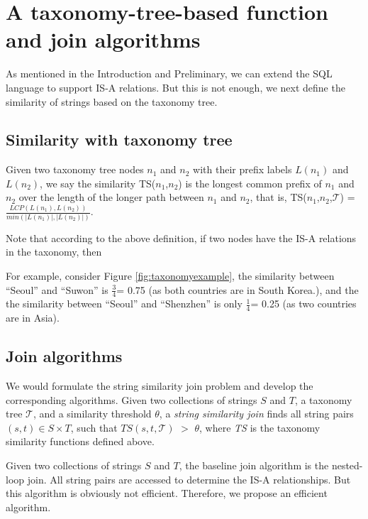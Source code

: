 \section{A taxonomy-tree-based function and join algorithms}

As mentioned in the Introduction and Preliminary, we can extend the SQL language to support IS-A relations. But this is not enough, we next define the similarity of strings based on the taxonomy tree.


\subsection{Similarity with taxonomy tree}


\begin{definition}
Given two taxonomy tree nodes $n_1$ and $n_2$ with their prefix labels $L(n_1)$ and $L(n_2)$, we say the similarity TS($n_1$,$n_2$) is the longest common prefix of  $n_1$ and $n_2$ over the length of the longer path between $n_1$ and $n_2$, that is,  TS($n_1$,$n_2$,$\mathcal{T}$) = $\frac{LCP(L(n_1),L(n_2))}{min(|L(n_1)|,|L(n_2)|)}$. \end{definition}

\smallskip

Note that according to the above definition, if two nodes have the IS-A relations in the taxonomy, then

For example, consider Figure \ref{fig:taxonomyexample}, the similarity between ``\textsf{Seoul}'' and ``\textsf{Suwon}'' is $\frac{3}{4}$= 0.75 (as both countries are in South Korea.), and the the similarity between ``\textsf{Seoul}'' and ``\textsf{Shenzhen}'' is only $\frac{1}{4}$= 0.25 (as two countries are in Asia).

\subsection{Join algorithms}


We would formulate the string similarity join problem and develop the corresponding algorithms. Given two collections of strings $S$ and $T$, a taxonomy tree
$\mathcal{T}$, and a similarity threshold $\theta$, a \textit{string
  similarity join} finds all string pairs $(s, t) \in S \times T$,
such that $TS(s,t,\mathcal{T})$ $>$ $\theta$, where \textit{TS} is
 the taxonomy similarity functions defined above.



Given two collections of strings $S$ and $T$, the baseline join algorithm is the nested-loop join. All string pairs are accessed to determine the IS-A relationships. But this algorithm is obviously not efficient. Therefore, we propose an efficient algorithm.

